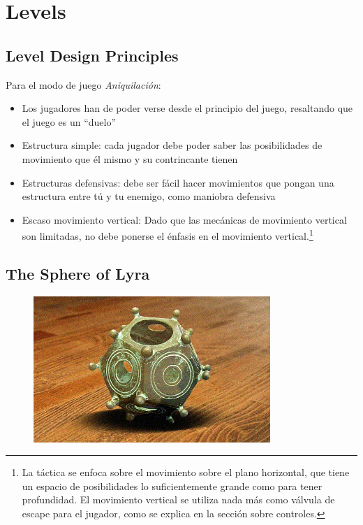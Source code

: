 \documentclass[12pt]{report}
\begin{document}
\section{Levels}

\subsection{Level Design Principles}

Para el modo de juego \textit{Aniquilación}:

\begin{itemize}
	\item Los jugadores han de poder verse desde el principio del juego, resaltando que el juego es un ``duelo''
	\item Estructura simple: cada jugador debe poder saber las posibilidades de movimiento que él mismo y su contrincante tienen
	\item Estructuras defensivas: debe ser fácil hacer movimientos que pongan una estructura entre tú y tu enemigo, como maniobra defensiva
	\item Escaso movimiento vertical: Dado que las mecánicas de movimiento vertical son limitadas, no debe ponerse el énfasis en el movimiento vertical.\footnote{La táctica se enfoca sobre el movimiento sobre el plano horizontal, que tiene un espacio de posibilidades lo suficientemente grande como para tener profundidad. El movimiento vertical se utiliza nada más como válvula de escape para el jugador, como se explica en la sección sobre controles.}
\end{itemize}

\subsection{The Sphere of Lyra}

\begin{figure}[H]
    \centering
    \includegraphics[width=0.8\textwidth]{sphere_of_lyra_0}
\end{figure}
\end{document}

